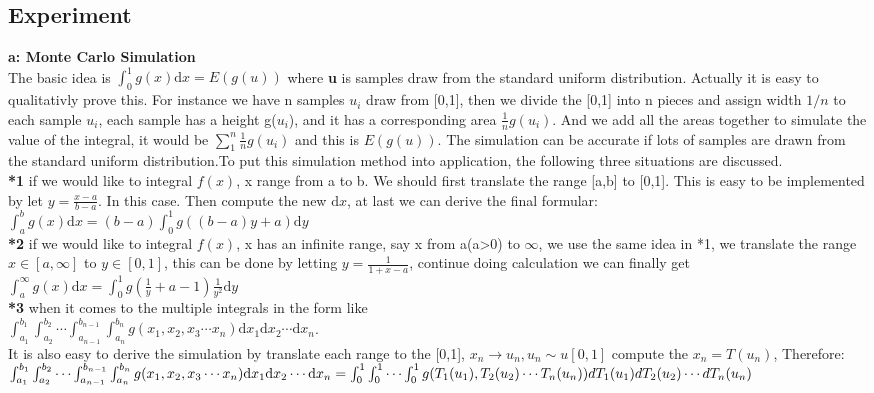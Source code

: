 \documentclass[twoside]{article}
\begin{document}
\subsection{\normalsize{Experiment}}
\noindent \textbf {a: Monte Carlo Simulation}\\
The basic idea is $\int_0^1g(x)\mathrm{d}x = E(g(u))$ where \textbf{u} is samples draw from the standard uniform distribution. Actually it is easy to qualitativly prove this. For instance we have n samples $u_i$ draw from [0,1], then we divide the [0,1] into n pieces and assign width $1/n$ to each sample $u_i$, each sample has a height g($u_i$), and it has a corresponding area $\frac{1}{n}g(u_i)$. And we add all the areas together to simulate the value of the integral, it would be $\displaystyle\sum_{1}^{n}\frac{1}{n}g(u_i)$ and this is $E(g(u))$. The simulation can be accurate if lots of samples are drawn from the standard uniform distribution.To put this simulation method into application, the following three situations are discussed.\\
\noindent \textbf {*1} if we would like to integral $f(x)$, x range from a to b. We should first translate the range [a,b] to [0,1]. This is easy to be implemented by let $y = \frac{x-a}{b-a}$. In this case. Then compute the new $\mathrm{d}x$, at last we can derive the final formular: $\int_a^b g(x) \mathrm{d}x = (b-a)\int_0^1g((b-a)y + a)\mathrm{d}y$\\
\noindent \textbf {*2} if we would like to integral $f(x)$, x has an infinite range, say x from a(a>0) to $\infty$, we use the same idea in *1, we translate the range $x \in [a,\infty]$ to $y \in [0,1]$, this can be done by letting $y = \frac{1}{1+x-a}$, continue doing calculation we can finally get $\int_a^\infty g(x)\mathrm{d}x = \int_0^1 g(\frac{1}{y}+a-1)\frac{1}{y^2}\mathrm{d}y$\\
\noindent \textbf {*3} when it comes to the multiple integrals in the form like\\ $\int_{a_1}^{b_1}\int_{a_2}^{b_2}\cdots\int_{a_{n-1}}^{b_{n-1}}\int_{a_n}^{b_n}g(x_1,x_2,x_3\cdots x_n)\mathrm{d}x_1\mathrm{d}x_2\cdots\mathrm{d}x_n$. \\It is also easy to derive the simulation by translate each range to the [0,1], $x_n \rightarrow u_n, u_n \sim u[0,1]$ compute the $x_n = T(u_n)$, Therefore: $\int_{a_1}^{b_1}\int_{a_2}^{b_2}\cdots\int_{a_{n-1}}^{b_{n-1}}\int_{a_n}^{b_n}g(x_1,x_2,x_3\cdots x_n)\mathrm{d}x_1\mathrm{d}x_2\cdots\mathrm{d}x_n \\ = \int_0^1\int_0^1\cdots\int_0^1g(T_1(u_1),T_2(u_2)\cdots T_n(u_n))dT_1(u_1)dT_2(u_2)\cdots dT_n(u_n)$\\
\end{document}
